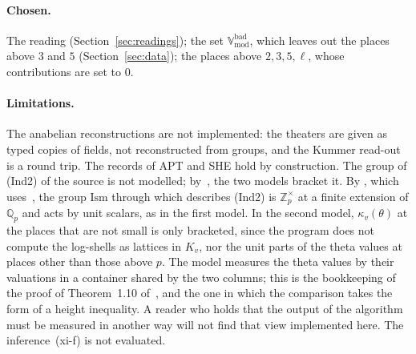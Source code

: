 \documentclass[11pt,a4paper]{article}
\newcommand{\Q}{\mathbb{Q}}
\newcommand{\Z}{\mathbb{Z}}
\newcommand{\Vbad}{\mathbb{V}^{\mathrm{bad}}_{\mathrm{mod}}}
\begin{document}
\paragraph{Chosen.} The reading (Section~\ref{sec:readings}); the set $\Vbad$, which leaves out the places above $3$
and $5$ (Section~\ref{sec:data}); the places above $2,3,5,\ell$, whose contributions are set to $0$.

\paragraph{Limitations.} The anabelian reconstructions are not implemented: the theaters are given as typed copies of
fields, not reconstructed from groups, and the Kummer read-out is a round trip. The records of APT and SHE hold by
construction. The group of (Ind2) of the source is not modelled; by~\cite{LANAiut}, the two models bracket it. By
\cite[\S6, Proposition~9]{Fourth}, which uses~\cite[Thm.~F]{MT}, the group $\mathrm{Ism}$ through which
\cite[Thm.~3.11(i)]{IUT3} describes (Ind2) is $\Z_p^\times$ at a finite extension of $\Q_p$ and acts by unit scalars,
as in the first model. In
the second model, $\kappa_v(\theta)$ at the places that are not small is only bracketed, since the program does not
compute the log-shells as lattices in $K_v$, nor the unit parts of the theta values at places other than those
above $p$.
The model measures the theta values by their valuations in a container shared by the two columns; this is the
bookkeeping of the proof of Theorem~1.10 of~\cite{IUT4}, and the one in which the comparison takes the form of a
height inequality. A reader who holds that the output of the algorithm must be measured in another way will not find
that view implemented here. The inference~(xi-f) is not evaluated.
\end{document}

